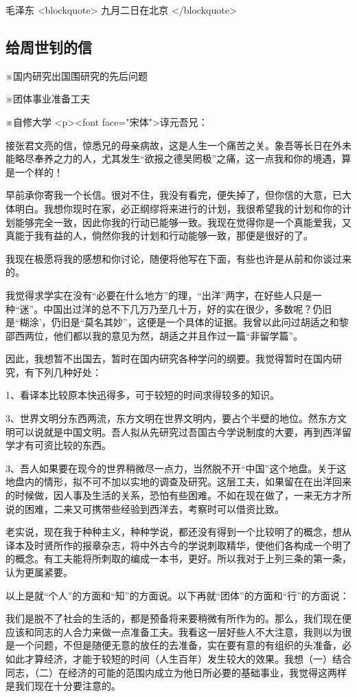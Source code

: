  毛泽东
<blockquote>
九月二日在北京
</blockquote>
\subsection{给周世钊的信}
※国内研究出国围研究的先后问题

※团体事业准备工夫

※自修大学
<p><font face="宋体">谆元吾兄：

接张君文亮的信，惊悉兄的母亲病故，这是人生一个痛苦之关。象吾等长日在外未能略尽奉养之力的人，尤其发生“欲报之德吴罔极”之痛，这一点我和你的境遇，算是一个样的！


早前承你寄我一个长信。很对不住，我没有看完，便失掉了，但你信的大意，已大体明白。我想你现时在家，必正纲缪将来进行的计划，我很希望我的计划和你的计划能够完全一致，因此你我的行动已能够一致。我现在觉得你是一个真能爱我，又真能于我有益的人，倘然你我的计划和行动能够一致，那便是很好的了。

我现在极愿将我的感想和你讨论，随便将他写在下面，有些也许是从前和你谈过来的。

我觉得求学实在没有“必要在什么地方”的理，“出洋”两字，在好些人只是一种“迷”。中国出过洋的总不下几万乃至几十万，好的实在很少，多数呢？仍旧是“糊涂’，仍旧是“莫名其妙”，这便是一个具体的证据。我曾以此问过胡适之和黎邵西两位，他们都以我的意见为然，胡适之并且作过一篇“非留学篇”。

因此，我想暂不出国去，暂时在国内研究各种学问的纲要。我觉得暂时在国内研究，有下列几种好处：

1、看译本比较原本快迅得多，可于较短的时间求得较多的知识。

3、世界文明分东西两流，东方文明在世界文明内，要占个半壁的地位。然东方文明可以说就是中国文明。吾人拟从先研究过吾国古今学说制度的大要，再到西洋留学才有可资比较的东西。

3、吾人如果要在现今的世界稍微尽一点力，当然脱不开“中国”这个地盘。关于这地盘内的情形，拟不可不加以实地的调查及研究。这层工夫，如果留在在出洋回来的时候做，因人事及生活的关系，恐怕有些困难。不如在现在做了，一来无方才所说的困难，二来又可携带些经验到西洋去，考察时可以借资比致。

老实说，现在我于种种主义，种种学说，都还没有得到一个比较明了的概念，想从译本及时贤所作的报章杂志，将中外古今的学说刺取精华，使他们各构成一个明了的概念。有工夫能将所刺取的编成一本书，更好。所以我对于上列三条的第一条，认为更属紧要。

以上是就“个人”的方面和“知”的方面说。以下再就“团体”的方面和“行”的方面说：

我们是脱不了社会的生活的，都是预备将来要稍微有所作为的。那么，我们现在便应该和同志的人合力来做一点准备工夫。我看这一层好些人不大注意，我则以为很是一个问题，不但是随便无意的放任的去准备，实在要有意的有组织的头准备，必如此才算经济，才能于较短的时间（人生百年）发生较大的效果。我想（一）结合同志，（二）在经济的可能的范围内成立为他日所必要的基础事业，我觉得这两样是我们现在十分要注意的。

